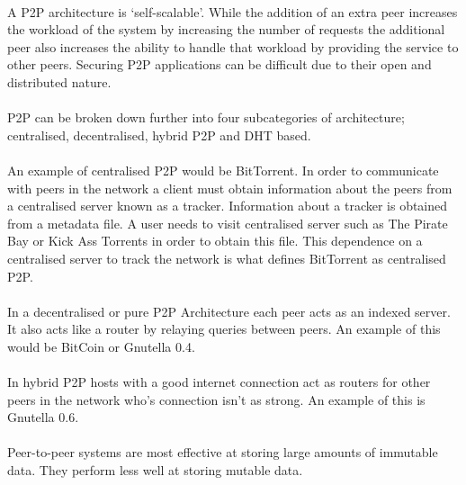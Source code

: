 \documentclass[11pt]{amsart}
\begin{document}
\paragraph{}
A P2P architecture is `self-scalable'. While the addition of an extra peer increases the workload of the system by increasing the number of requests the additional peer also increases the ability to handle that workload by providing the service to other peers. Securing P2P applications can be difficult due to their open and distributed nature.
\paragraph{}
P2P can be broken down further into four subcategories of architecture; centralised, decentralised, hybrid P2P and DHT based.
\paragraph{}
An example of centralised P2P would be BitTorrent. In order to communicate with peers in the network a client must obtain information about the peers from a centralised server known as a tracker. Information about a tracker is obtained from a metadata file. A user needs to visit centralised server such as The Pirate Bay or Kick Ass Torrents in order to obtain this file. This dependence on a centralised server to track the network is what defines BitTorrent as centralised P2P.
\paragraph{}
In a decentralised or pure P2P Architecture each peer acts as an indexed server. It also acts like a router by relaying queries between peers. An example of this would be BitCoin or Gnutella 0.4.
\paragraph{}
In hybrid P2P hosts with a good internet connection act as routers for other peers in the network who's connection isn't as strong. An example of this is Gnutella 0.6.

\paragraph{}
Peer-to-peer systems are most effective at storing large amounts of immutable data. They perform less well at storing mutable data.
\end{document}
